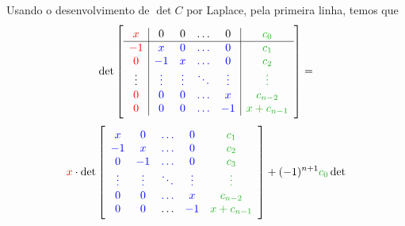 \documentclass[11pt,a4paper]{article}
\begin{document}
{Usando o desenvolvimento de $\det C$ por Laplace, pela primeira linha, temos que
\[
\det \left[ \begin{array}{c|cccc|c} \textcolor{red}{x} & 0 & 0 & \ldots & 0 & \textcolor{Verde}{c_0} \\ \hline \textcolor{red}{-1} & \textcolor{blue}{x} & \textcolor{blue}{0} & \textcolor{blue}{\ldots} & \textcolor{blue}{0} & \textcolor{Verde}{c_1} \\ \textcolor{red}{0} & \textcolor{blue}{-1} & \textcolor{blue}{x} & \textcolor{blue}{\ldots} & \textcolor{blue}{0} & \textcolor{Verde}{c_2} \\ \vdots & \textcolor{blue}{\vdots} & \textcolor{blue}{\vdots} & \textcolor{blue}{\ddots} & \textcolor{blue}{\vdots} & \textcolor{Verde}{\vdots} \\  \textcolor{red}{0} & \textcolor{blue}{0} & \textcolor{blue}{0} & \textcolor{blue}{\ldots} & \textcolor{blue}{x} & \textcolor{Verde}{c_{n-2}}  \\  \textcolor{red}{0} & \textcolor{blue}{0} & \textcolor{blue}{0} & \textcolor{blue}{\ldots} & \textcolor{blue}{-1} & \textcolor{Verde}{x + c_{n-1}}\end{array} \right] = \]\[
\textcolor{red}{x} \cdot \det
\left[ \begin{array}{ccccc} \textcolor{blue}{x} & \textcolor{blue}{0} & \textcolor{blue}{\ldots} & \textcolor{blue}{0} & \textcolor{Verde}{c_1} \\ \textcolor{blue}{-1} & \textcolor{blue}{x} & \textcolor{blue}{\ldots} & \textcolor{blue}{0} & \textcolor{Verde}{c_2} \\ \textcolor{blue}{0} & \textcolor{blue}{-1} & \textcolor{blue}{\ldots} & \textcolor{blue}{0} & \textcolor{Verde}{c_3} \\ \textcolor{blue}{\vdots} & \textcolor{blue}{\vdots} & \textcolor{blue}{\ddots} & \textcolor{blue}{\vdots} & \textcolor{Verde}{\vdots} \\  \textcolor{blue}{0} & \textcolor{blue}{0} & \textcolor{blue}{\ldots} & \textcolor{blue}{x} & \textcolor{Verde}{c_{n-2}}  \\  \textcolor{blue}{0} & \textcolor{blue}{0} & \ldots & \textcolor{blue}{-1} & \textcolor{Verde}{x + c_{n-1}}\end{array} \right] + (-1)^{n+1} \textcolor{Verde}{c_0} \det
\]}
\end{document}
